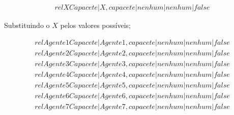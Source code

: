 \documentclass[12pt]{article}
\begin{document}
\begin{eqnarray}
	relXCapacete | X,capacete | nenhum | nenhum | false
\end{eqnarray}


Substituindo o $X$ pelos valores possíveis; 


\begin{eqnarray}
relAgente1Capacete | Agente1 ,capacete | nenhum | nenhum | false \nonumber \\
relAgente2Capacete | Agente2 ,capacete | nenhum | nenhum | false \nonumber \\ 
relAgente3Capacete | Agente3 ,capacete | nenhum | nenhum | false \nonumber \\ 
relAgente4Capacete | Agente4 ,capacete | nenhum | nenhum | false \nonumber \\
relAgente5Capacete | Agente5 ,capacete | nenhum | nenhum | false \nonumber \\
relAgente6Capacete | Agente6 ,capacete | nenhum | nenhum | false \nonumber \\
relAgente7Capacete | Agente7 ,capacete | nenhum | nenhum | false\nonumber \\
\nonumber \\
\end{eqnarray}
\end{document}
